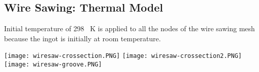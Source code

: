 \subsection{Wire Sawing: Thermal Model}

Initial temperature of 298 \SI{}{K} is applied to all the nodes of the wire sawing mesh because the ingot is initially at room temperature. 


\noindent
\begin{minipage}[c]{\textwidth}
\centering
        \captionsetup{type=figure}
        \texttt{[image: wiresaw-crossection.PNG]}
        \texttt{[image: wiresaw-crossection2.PNG]}
        \texttt{[image: wiresaw-groove.PNG]}
        \label{fig:wiresawing-crossection}
 \end{minipage}
